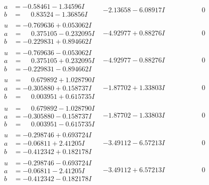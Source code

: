 \documentclass[1p]{elsarticle_modified}
\theoremstyle{definition}
\begin{document}
$$\begin{array}{c|c|c}
\begin{aligned}
a &= -0.58461 - 1.34596 I \\
b &= \phantom{-}0.83524 - 1.36856 I\end{aligned}
 & -2.13658 - 6.08917 I & \phantom{-0.000000 } 0 \\ \hline\begin{aligned}
u &= -0.769636 + 0.053062 I \\
a &= \phantom{-}0.375105 - 0.232095 I \\
b &= -0.229831 + 0.894662 I\end{aligned}
 & -4.92977 + 0.88276 I & \phantom{-0.000000 } 0 \\ \hline\begin{aligned}
u &= -0.769636 - 0.053062 I \\
a &= \phantom{-}0.375105 + 0.232095 I \\
b &= -0.229831 - 0.894662 I\end{aligned}
 & -4.92977 - 0.88276 I & \phantom{-0.000000 } 0 \\ \hline\begin{aligned}
u &= \phantom{-}0.679892 + 1.028790 I \\
a &= -0.305880 + 0.158737 I \\
b &= \phantom{-}0.003951 + 0.615735 I\end{aligned}
 & -1.87702 + 1.33803 I & \phantom{-0.000000 } 0 \\ \hline\begin{aligned}
u &= \phantom{-}0.679892 - 1.028790 I \\
a &= -0.305880 - 0.158737 I \\
b &= \phantom{-}0.003951 - 0.615735 I\end{aligned}
 & -1.87702 - 1.33803 I & \phantom{-0.000000 } 0 \\ \hline\begin{aligned}
u &= -0.298746 + 0.693724 I \\
a &= -0.06811 + 2.41205 I \\
b &= -0.412342 + 0.182178 I\end{aligned}
 & -3.49112 - 6.57213 I & \phantom{-0.000000 } 0 \\ \hline\begin{aligned}
u &= -0.298746 - 0.693724 I \\
a &= -0.06811 - 2.41205 I \\
b &= -0.412342 - 0.182178 I\end{aligned}
 & -3.49112 + 6.57213 I & \phantom{-0.000000 } 0 \\ \hline\begin{aligned}

\end{aligned}
\end{array}$$
\end{document}
